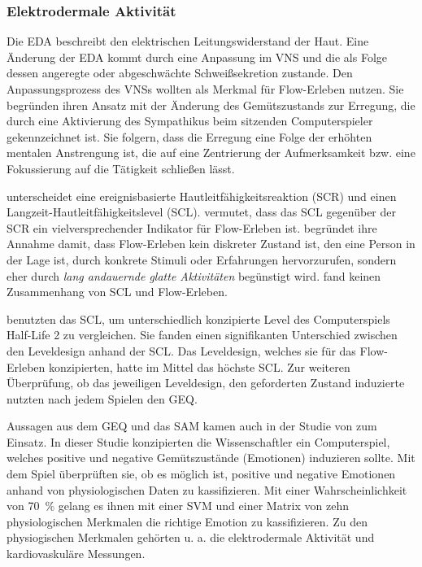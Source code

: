 \subsubsection{Elektrodermale Aktivität} 

\label{ssub:elektrodermale_aktivitat}

Die \ac{EDA} beschreibt den elektrischen Leitungswiderstand der Haut. Eine Änderung der \ac{EDA} kommt durch eine Anpassung im \acs{VNS} und die als Folge dessen angeregte oder abgeschwächte Schweißsekretion zustande. Den Anpassungsprozess des \acs{VNS}s wollten \citet{Kivikangas2006, Nacke2008} als Merkmal für Flow-Erleben nutzen. Sie begründen ihren Ansatz mit der Änderung des Gemütszustands zur Erregung, die durch eine Aktivierung des Sympathikus beim sitzenden Computerspieler gekennzeichnet ist. Sie folgern, dass die Erregung eine Folge der erhöhten mentalen Anstrengung ist, die auf eine Zentrierung der Aufmerksamkeit bzw. eine Fokussierung auf die Tätigkeit schließen lässt.

\citet{Kilpatrick1972} unterscheidet eine ereignisbasierte Hautleitfähigkeitsreaktion (\ac{SCR}) und einen Langzeit-Hautleitfähigkeitslevel (\ac{SCL}). \citet[][S.~158]{Peifer2012} vermutet, dass das \ac{SCL} gegenüber der \ac{SCR} ein vielversprechender Indikator für Flow-Erleben ist. \citet[][S.~158]{Peifer2012} begründet ihre Annahme damit, dass Flow-Erleben kein diskreter Zustand ist, den eine Person in der Lage ist, durch konkrete Stimuli oder Erfahrungen hervorzurufen, sondern eher durch \emph{lang andauernde glatte Aktivitäten} begünstigt wird. \citet{Kilpatrick1972} fand keinen Zusammenhang von \ac{SCL} und Flow-Erleben. 

\citet{Nacke2008} benutzten das \ac{SCL}, um unterschiedlich konzipierte Level des Computerspiels Half-Life 2 zu vergleichen. Sie fanden einen signifikanten Unterschied zwischen den Leveldesign anhand der \ac{SCL}. Das Leveldesign, welches sie für das Flow-Erleben konzipierten, hatte im Mittel das höchste \ac{SCL}. Zur weiteren Überprüfung, ob das jeweiligen Leveldesign, den geforderten Zustand induzierte nutzten \citet{Nacke2008} nach jedem Spielen den \ac{GEQ}.

Aussagen aus dem \ac{GEQ} und das \ac{SAM} kamen auch in der Studie von \citet{Friedrichs2015} zum Einsatz. In dieser Studie konzipierten die Wissenschaftler ein Computerspiel, welches positive und negative Gemütszustände (Emotionen) induzieren sollte. Mit dem Spiel überprüften sie, ob es möglich ist, positive und negative Emotionen anhand von physiologischen Daten zu kassifizieren. Mit einer Wahrscheinlichkeit von 70~\% gelang es ihnen mit einer \ac{SVM} und einer Matrix von zehn physiologischen Merkmalen die richtige Emotion zu kassifizieren. Zu den physiogischen Merkmalen gehörten u. a. die elektrodermale Aktivität und kardiovaskuläre Messungen.

